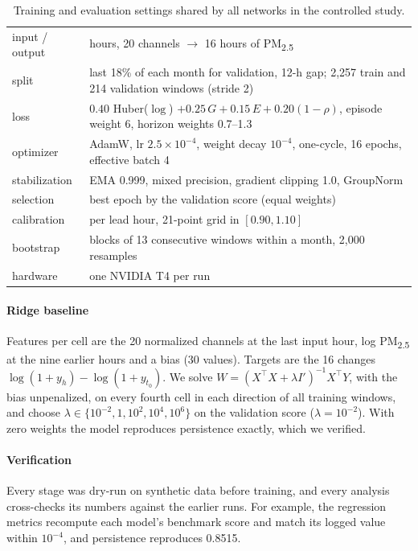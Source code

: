 \documentclass[10pt]{article}
\newcommand{\PM}{PM\textsubscript{2.5}}
\begin{document}
\begin{table}[h]
\caption{Training and evaluation settings shared by all networks in the controlled study.}
\centering\small
\begin{tabular}{@{}l >{\raggedright\arraybackslash}p{10.2cm}@{}}
\toprule
input / output & 10 hours, 20 channels $\to$ 16 hours of \PM{} \\
split & last 18\% of each month for validation, 12-h gap; 2{,}257 train and 214 validation windows (stride 2) \\
loss & $0.40$ Huber($\log$) $+ 0.25\,G + 0.15\,E + 0.20(1-\rho)$, episode weight 6, horizon weights 0.7--1.3 \\
optimizer & AdamW, lr $2.5\times10^{-4}$, weight decay $10^{-4}$, one-cycle, 16 epochs, effective batch 4 \\
stabilization & EMA 0.999, mixed precision, gradient clipping 1.0, GroupNorm \\
selection & best epoch by the validation score (equal weights) \\
calibration & per lead hour, 21-point grid in $[0.90, 1.10]$ \\
bootstrap & blocks of 13 consecutive windows within a month, 2{,}000 resamples \\
hardware & one NVIDIA T4 per run \\
\bottomrule
\end{tabular}
\end{table}

\paragraph{Ridge baseline}
Features per cell are the 20 normalized channels at the last input hour, log \PM{} at the nine earlier hours and a bias (30 values). Targets are the 16 changes $\log(1+y_h)-\log(1+y_{t_0})$. We solve $W=(X^\top X+\lambda I')^{-1}X^\top Y$, with the bias unpenalized, on every fourth cell in each direction of all training windows, and choose $\lambda\in\{10^{-2},1,10^{2},10^{4},10^{6}\}$ on the validation score ($\lambda=10^{-2}$). With zero weights the model reproduces persistence exactly, which we verified.

\paragraph{Verification}
Every stage was dry-run on synthetic data before training, and every analysis cross-checks its numbers against the earlier runs. For example, the regression metrics recompute each model's benchmark score and match its logged value within $10^{-4}$, and persistence reproduces 0.8515.
\end{document}
